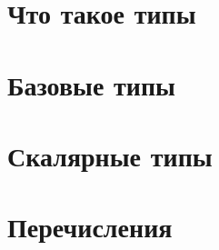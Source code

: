 \documentclass[book.tex]{subfiles}
\begin{document}
%


\maketitle 

\section*{Что такое типы}

\section*{Базовые типы}

\section*{Скалярные типы}

\section*{Перечисления}
\end{document}
